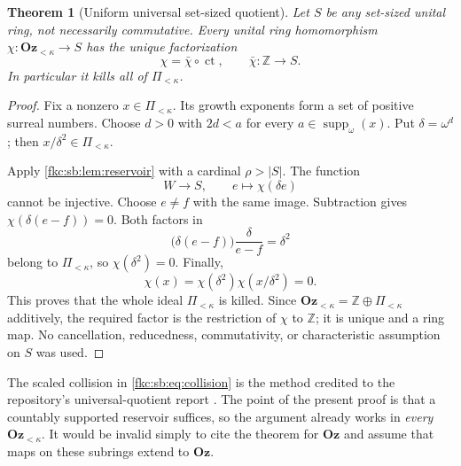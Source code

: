\documentclass[11pt,letterpaper]{article}
\numberwithin{equation}{section}
\newtheorem{theorem}{Theorem}[section]
\theoremstyle{definition}
\theoremstyle{remark}
\newcommand{\Z}{\mathbb Z}
\newcommand{\Oz}{\mathbf{Oz}}
\newcommand{\suppw}{\operatorname{supp}_{\omega}}
\newcommand{\ct}{\operatorname{ct}}
\newcommand{\card}[1]{\lvert #1\rvert}
\newcommand{\Ok}{\Oz_{<\kappa}}
\newcommand{\Pk}{\Pi_{<\kappa}}
\begin{document}
\begin{theorem}[Uniform universal set-sized quotient]\label{fkc:sb:thm:smallquotient}
Let $S$ be any set-sized unital ring, not necessarily commutative. Every unital ring homomorphism $\chi:\Ok\to S$ has the unique factorization
\[
 \chi=\bar\chi\circ\ct,
 \qquad \bar\chi:\Z\longrightarrow S.
\]
In particular it kills all of $\Pk$.
\end{theorem}
\begin{proof}
Fix a nonzero $x\in\Pk$. Its growth exponents form a set of positive surreal numbers. Choose $d>0$ with $2d<a$ for every $a\in\suppw(x)$. Put $\delta=\omega^d$; then $x/\delta^2\in\Pk$.

Apply \cref{fkc:sb:lem:reservoir} with a cardinal $\rho>\card S$. The function
\[
 W\longrightarrow S,\qquad e\longmapsto\chi(\delta e)
\]
cannot be injective. Choose $e\ne f$ with the same image. Subtraction gives $\chi(\delta(e-f))=0$. Both factors in
\begin{equation}\label{fkc:sb:eq:collision}
 \bigl(\delta(e-f)\bigr)\frac{\delta}{e-f}=\delta^2
\end{equation}
belong to $\Pk$, so $\chi(\delta^2)=0$. Finally,
\[
 \chi(x)=\chi(\delta^2)\chi(x/\delta^2)=0.
\]
This proves that the whole ideal $\Pk$ is killed. Since $\Ok=\Z\oplus\Pk$ additively, the required factor is the restriction of $\chi$ to $\Z$; it is unique and a ring map. No cancellation, reducedness, commutativity, or characteristic assumption on $S$ was used.
\end{proof}

The scaled collision in \eqref{fkc:sb:eq:collision} is the method credited to the repository's universal-quotient report \cite{CollOSQ}. The point of the present proof is that a countably supported reservoir suffices, so the argument already works in \emph{every} $\Ok$. It would be invalid simply to cite the theorem for $\Oz$ and assume that maps on these subrings extend to $\Oz$.
\end{document}

